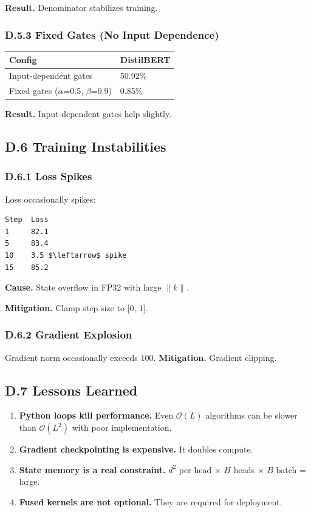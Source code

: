 \textbf{Result.} Denominator stabilizes training.

\subsubsection{D.5.3 Fixed Gates (No Input Dependence)}

\begin{table}[H]
\centering
\small
\begin{tabular}{ll}
\toprule
\textbf{Config} & \textbf{DistilBERT} \\
\midrule
Input-dependent gates & 50.92\% \\
Fixed gates ($\alpha$=0.5, $\beta$=0.9) & 0.85\% \\
\bottomrule
\end{tabular}
\end{table}

\textbf{Result.} Input-dependent gates help slightly.

\subsection{D.6 Training Instabilities}

\subsubsection{D.6.1 Loss Spikes}

Loss occasionally spikes:

\begin{lstlisting}
Step  Loss
1     82.1
5     83.4
10    3.5 $\leftarrow$ spike
15    85.2
\end{lstlisting}

\textbf{Cause.} State overflow in FP32 with large $\|k\|$.

\textbf{Mitigation.} Clamp step size to [0, 1].

\subsubsection{D.6.2 Gradient Explosion}

Gradient norm occasionally exceeds 100. \textbf{Mitigation.} Gradient clipping.

\subsection{D.7 Lessons Learned}

\begin{enumerate}
\item \textbf{Python loops kill performance.} Even $\mathcal{O}(L)$ algorithms can
  be slower than $\mathcal{O}(L^2)$ with poor implementation.
\item \textbf{Gradient checkpointing is expensive.} It doubles compute.
\item \textbf{State memory is a real constraint.} $d^2$ per head $\times$ $H$ heads $\times$ $B$
  batch = large.
\item \textbf{Fused kernels are not optional.} They are required for deployment.

\end{enumerate}
